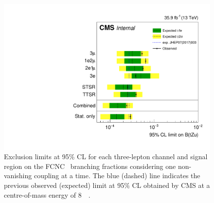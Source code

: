 \begin{figure}[htbp]
	\centering
	\includegraphics[width=1.\linewidth]{6_Search/Figures/TOP-17-017_limitsZutStat.pdf}
	\caption{Exclusion limits at 95\% CL for each three-lepton channel and signal region on the FCNC \Zut\ branching fractions considering one non-vanishing coupling at a time. The blue (dashed) line indicates the previous observed (expected) limit at 95\% CL obtained by CMS at a centre-of-mass energy of 8~\TeV~\cite{Sirunyan:2017kkr}.}	
	\label{fig:exclusionlimitbrcomp}
\end{figure}

